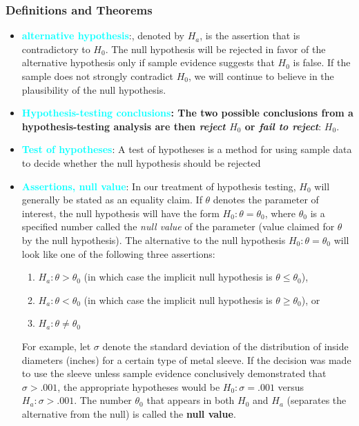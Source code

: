 \documentclass{report}
\begin{document}
    \subsubsection{Definitions and Theorems}
    \begin{itemize}
        \item \textbf{\textcolor{cyan}{alternative hypothesis}}:, denoted by \( H_a \), is the assertion that is contradictory to \( H_0 \).
            \bigbreak \noindent 
            The null hypothesis will be rejected in favor of the alternative hypothesis only if sample evidence suggests that \( H_0 \) is false. If the sample does not strongly contradict \( H_0 \), we will continue to believe in the plausibility of the null hypothesis. 
        \item \textbf{\textcolor{cyan}{Hypothesis-testing conclusions}: The two possible conclusions from a hypothesis-testing analysis are then \textit{reject} \( H_0 \) or \textit{fail to reject}}: \( H_0 \).
    \item \textbf{\textcolor{cyan}{Test of hypotheses}}: 
        A test of hypotheses is a method for using sample data to decide whether the null hypothesis should be rejected
    \item \textbf{\textcolor{cyan}{Assertions, null value}}:
    In our treatment of hypothesis testing, \( H_0 \) will generally be stated as an equality claim. If \( \theta \) denotes the parameter of interest, the null hypothesis will have the form \( H_0: \theta = \theta_0 \), where \( \theta_0 \) is a specified number called the \textit{null value} of the parameter (value claimed for \( \theta \) by the null hypothesis). 
    \bigbreak \noindent 
    The alternative to the null hypothesis \( H_0: \theta = \theta_0 \) will look like one of the following three assertions:
    \begin{enumerate}
        \item \( H_a: \theta > \theta_0 \) (in which case the implicit null hypothesis is \( \theta \leq \theta_0 \)),
        \item \( H_a: \theta < \theta_0 \) (in which case the implicit null hypothesis is \( \theta \geq \theta_0 \)), or
        \item \( H_a: \theta \neq \theta_0 \)
    \end{enumerate}
    For example, let \( \sigma \) denote the standard deviation of the distribution of inside diameters (inches) for a certain type of metal sleeve. If the decision was made to use the sleeve unless sample evidence conclusively demonstrated that \( \sigma > .001 \), the appropriate hypotheses would be \( H_0: \sigma = .001 \) versus \( H_a: \sigma > .001 \). The number \( \theta_0 \) that appears in both \( H_0 \) and \( H_a \) (separates the alternative from the null) is called the \textbf{null value}.

\end{itemize}
\end{document}
